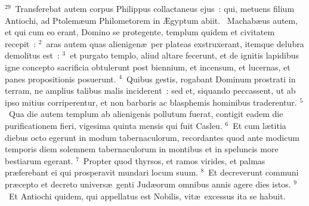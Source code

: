 ${}^{29}$~Transferebat autem corpus Philippus collactaneus ejus~: qui, metuens filium Antiochi, ad Ptolem\ae um Philometorem in \AE gyptum abiit.
~\lettrine[lines=10,image=true,loversize=0.05,lraise=-0.03]{M}{}achab\ae us autem, et qui cum eo erant, Domino se protegente, templum quidem et civitatem recepit~:
${}^{2}$~aras autem quas alienigen\ae\ per plateas exstruxerant, itemque delubra demolitus est~:
${}^{3}$~et purgato templo, aliud altare fecerunt, et de ignitis lapidibus igne concepto sacrificia obtulerunt post biennium, et incensum, et lucernas, et panes propositionis posuerunt.
${}^{4}$~Quibus gestis, rogabant Dominum prostrati in terram, ne amplius talibus malis inciderent~: sed et, siquando peccassent, ut ab ipso mitius corriperentur, et non barbaris ac blasphemis hominibus traderentur.
${}^{5}$~Qua die autem templum ab alienigenis pollutum fuerat, contigit eadem die purificationem fieri, vigesima quinta mensis qui fuit Casleu.
${}^{6}$~Et cum l\ae titia diebus octo egerunt in modum tabernaculorum, recordantes quod ante modicum temporis diem solemnem tabernaculorum in montibus et in speluncis more bestiarum egerant.
${}^{7}$~Propter quod thyrsos, et ramos virides, et palmas pr\ae ferebant ei qui prosperavit mundari locum suum.
${}^{8}$~Et decreverunt communi pr\ae cepto et decreto univers\ae\ genti Jud\ae orum omnibus annis agere dies istos.
${}^{9}$~Et Antiochi quidem, qui appellatus est Nobilis, vit\ae\ excessus ita se habuit.



